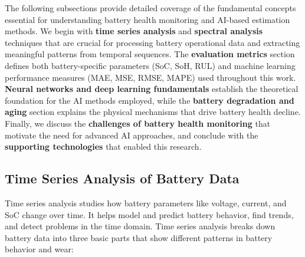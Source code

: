 
The following subsections provide detailed coverage of the fundamental concepts essential for understanding battery health monitoring and AI-based estimation methods. We begin with \textbf{time series analysis} and \textbf{spectral analysis} techniques that are crucial for processing battery operational data and extracting meaningful patterns from temporal sequences. The \textbf{evaluation metrics} section defines both battery-specific parameters (SoC, SoH, RUL) and machine learning performance measures (MAE, MSE, RMSE, MAPE) used throughout this work. \textbf{Neural networks and deep learning fundamentals} establish the theoretical foundation for the AI methods employed, while the \textbf{battery degradation and aging} section explains the physical mechanisms that drive battery health decline. Finally, we discuss the \textbf{challenges of battery health monitoring} that motivate the need for advanced AI approaches, and conclude with the \textbf{supporting technologies} that enabled this research.

\subsection{Time Series Analysis of Battery Data}

Time series analysis studies how battery parameters like voltage, current, and SoC change over time\cite{jorge_time_2023}. It helps model and predict battery behavior, find trends, and detect problems in the time domain. Time series analysis breaks down battery data into three basic parts that show different patterns in battery behavior and wear:

